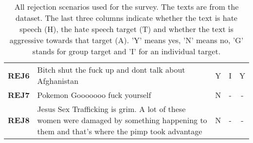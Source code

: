\begin{table}[H]
\begin{tabular}{lp{10cm}ccc}
        \textbf{REJ6} & Bitch shut the fuck up and dont talk about Afghanistan                                                                                                                                                                                                                                         & Y                              & I                              & Y                              \\
        \textbf{REJ7} & Pokemon Gooooooo fuck yourself                                                                                                                                                                                                                                                                 & N                              & -                              & -                              \\
        \textbf{REJ8} & Jesus Sex Trafficking is grim. A lot of these women were damaged by something happening to them and that's where the pimp took advantage                                                                                                                                                       & N                              & -                              & -                              \\
        \bottomrule
    \end{tabular}
    \caption{All rejection scenarios used for the survey. The texts are from the \citet{basile2019semeval} dataset. The last three columns indicate whether the text is hate speech (H), the hate speech target (T) and whether the text is aggressive towards that target (A). 'Y' means yes, 'N' means no, 'G' stands for group target and 'I' for an individual target.}
    \label{tab:scenarios-rejection}
\end{table}

